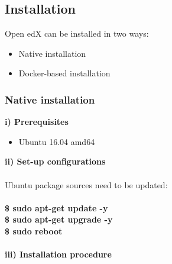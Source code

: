 \documentclass[12pt]{report}
\begin{document}
\subsection{Installation}
Open edX can be installed in two ways:
\begin{itemize}
	\item Native installation
	\item Docker-based installation
\end{itemize}
\subsubsection{Native installation}
\textbf{i) Prerequisites}
\begin{itemize}
	\item Ubuntu 16.04 amd64
\end{itemize}
\textbf{ii) Set-up configurations}\\\\
Ubuntu package sources need to be updated:\\\\
\textbf{\$ sudo apt-get update -y\\
	\$ sudo apt-get upgrade -y\\
	\$ sudo reboot\\\\
}
\textbf{iii) Installation procedure}
\end{document}
